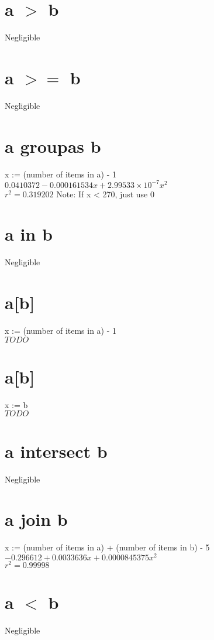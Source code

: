 \documentclass[12pt]{article}
\begin{document}
	\section{a $>$ b}
	Negligible
	
	\section{a $>=$ b}
	Negligible
	
	\section{a groupas b}
	x := (number of items in a) - 1\\
	$0.0410372 - 0.000161534 x + 2.99533 \times 10^{-7} x^2$\\
	$r^2 = 0.319202$
	Note: If x < 270, just use 0
	
	\section{a in b}
	Negligible
	
	\section{a[b]}
	x := (number of items in a) - 1\\
	$TODO$
	
	\section{a[b]}
	x := b\\
	$TODO$
	
	\section{a intersect b}
	Negligible
	
	\section{a join b}
	x := (number of items in a) + (number of items in b) - 5\\
	$-0.296612 + 0.0033636x + 0.0000845375x^2$\\
	$r^2 = 0.99998$
	
	\section{a $<$ b}
	Negligible
	
\end{document}
